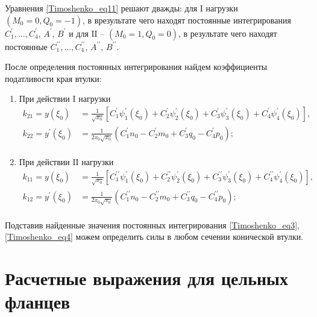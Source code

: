 Уравнения \eqref{Timoshenko_eq11} решают дважды: для ${\text{I}}$ нагрузки $\left (M_0=0, Q_0=-1 \right )$, в врезультате чего находят постоянные интегрирования $C_1^{\prime}, \ldots,C_4^{\prime}$, $A^{\prime}$, $B^{\prime}$ и для ${\text{II}}$ -- $\left (M_0=1, Q_0=0 \right )$, в результате чего находят постоянные $C_1^{\prime \prime}, \ldots,C_4^{\prime \prime}$, $A^{\prime \prime}$, $B^{\prime \prime}$.

После определения постоянных интегрирования найдем коэффициенты податливости края втулки:
\begin{enumerate}
  \item При действии ${\text{I}}$ нагрузки
  \begin{equation}
    \label{Timoshenko_eq12}
    \begin{split}
      k_{21}=y({\xi}_0)&=\frac{1}{\sqrt{x_0}} \left[ C_1^{\prime} \psi_1^{\prime}({\xi}_0) +C_2^{\prime} \psi_2^{\prime}({\xi}_0)+C_3^{\prime} \psi_3^{\prime}({\xi}_0)+C_4^{\prime} \psi_4^{\prime}({\xi}_0) \right],\\
      k_{22}=y^{\prime}({\xi}_0)&=\frac{1}{2x_0 \sqrt{x_0}} \left(C_1^{\prime} n_0-C_2^{\prime} m_0+C_3^{\prime} q_0-C_4^{\prime} p_0 \right);\\
    \end{split}  
  \end{equation}
  \item При действии ${\text{II}}$ нагрузки
  \begin{equation}
    \label{Timoshenko_eq13}
    \begin{split}
      k_{11}=y({\xi}_0)&=\frac{1}{\sqrt{x_0}} \left[ C_1^{\prime \prime} \psi_1^{\prime}({\xi}_0) +C_2^{\prime \prime} \psi_2^{\prime}({\xi}_0)+C_3^{\prime \prime} \psi_3^{\prime}({\xi}_0)+C_4^{\prime \prime} \psi_4^{\prime}({\xi}_0) \right],\\
      k_{12}=y^{\prime}({\xi}_0)&=\frac{1}{2x_0 \sqrt{x_0}} \left(C_1^{\prime \prime} n_0-C_2^{\prime \prime} m_0+C_3^{\prime \prime} q_0-C_4^{\prime \prime} p_0 \right);\\
    \end{split}  
  \end{equation}
  \end{enumerate}

Подставив найденные значения постоянных интегрирования \eqref{Timoshenko_eq3}, \eqref{Timoshenko_eq4} можем определить силы в любом сечении конической втулки.




\section{Расчетные выражения для цельных фланцев}
\label{SolidFlange}

